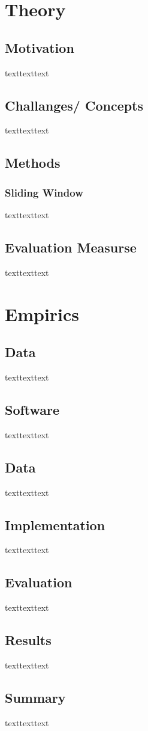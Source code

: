 \documentclass[12pt]{article}
\begin{document}

\renewcommand{\contentsname}{Table of Contents}
\tableofcontents

\newpage
\section{Theory}

\subsection{Motivation}
texttexttext

\subsection{Challanges/ Concepts}
texttexttext

\subsection{Methods}
\subsubsection{Sliding Window}
texttexttext

\subsection{Evaluation Measurse}
texttexttext

\section{Empirics}
\subsection{Data}
texttexttext

\subsection{Software}
texttexttext



\subsection{Data}
texttexttext

\subsection{Implementation}
texttexttext


\subsection{Evaluation}
texttexttext

\subsection{Results}
texttexttext

\subsection{Summary}
texttexttext
\end{document}
